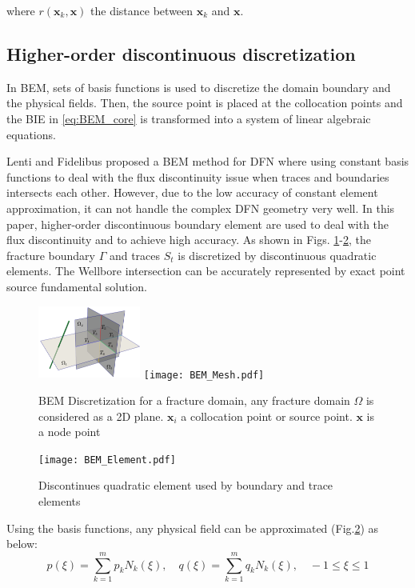 \documentclass[num-refs]{wiley-networks}
\begin{document}
where $r\left( \mathbf{x}_k,\mathbf{x} \right)$ the distance between $\mathbf{x}_k$ and $\mathbf{x}$.

\subsection{Higher-order discontinuous discretization}
In BEM, sets of basis functions is used to discretize the domain boundary and the physical fields. Then, the source point is placed at the collocation points and the BIE in \eqref{eq:BEM_core} is transformed into a system of linear algebraic equations.

Lenti and Fidelibus \cite{lenti2003} proposed a BEM method for DFN where using constant basis functions to deal with the flux discontinuity issue when traces and boundaries intersects each other. However, due to the low accuracy of constant element approximation, it can not handle the complex DFN geometry very well. In this paper, higher-order discontinuous boundary element are used to deal with the flux discontinuity and to achieve high accuracy. As shown in Figs. \ref{fig:BEM_Nodes}-\ref{fig:BEM_Eles}, the fracture boundary $\Gamma$ and traces $S_t$ is discretized by discontinuous quadratic elements. The Wellbore intersection can be accurately represented by exact point source fundamental solution. 

\begin{figure}[h!]
\centering
\includegraphics[width=0.3\textwidth]{SimpleDFN.pdf}
\texttt{[image: BEM\_Mesh.pdf]}
\caption{BEM Discretization for a fracture domain, any fracture domain $\Omega$ is considered as a 2D plane. $\mathbf{x}_{i}$ a collocation point or source point. $\mathbf{x}$ is a node point}
\label{fig:BEM_Nodes}
\end{figure}
\begin{figure}[h!]
\centering
\texttt{[image: BEM\_Element.pdf]}
\caption{Discontinues quadratic element used by boundary and trace elements}
\label{fig:BEM_Eles}
\end{figure}

Using the  basis functions, any physical field can be approximated (Fig.\ref{fig:BEM_Eles}) as below:
\begin{equation}
    p\left( \xi \right) =\sum_{k=1}^m{p_k}N _k\left( \xi \right) ,\quad q\left( \xi \right) =\sum_{k=1}^m{q_k}N _k\left( \xi \right) ,\quad -1\leqslant \xi \leqslant 1
\end{equation}
\end{document}
